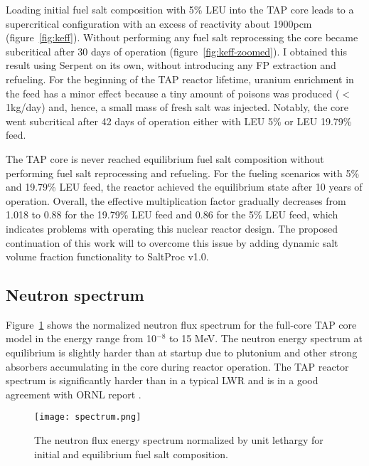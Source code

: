 Loading initial fuel salt composition with 5\% \gls{LEU} into the \gls{TAP} 
core leads to a supercritical configuration with an excess of reactivity about 
1900pcm (figure~\ref{fig:keff}). Without performing any fuel salt reprocessing 
the core became subcritical after 30 days of operation  
(figure~\ref{fig:keff-zoomed}). I obtained this result using Serpent on its 
own, without introducing any \gls{FP} extraction and refueling. For the 
beginning of the \gls{TAP} reactor lifetime, uranium enrichment in the feed 
has a minor effect because a tiny amount of poisons was produced ($<$1kg/day) 
and, hence, a small mass of fresh salt was injected. Notably, the core went 
subcritical after 42 days of operation either with \gls{LEU} 5\% or \gls{LEU} 
19.79\% feed.

The \gls{TAP} core is never reached equilibrium fuel salt composition without 
performing fuel salt reprocessing and refueling. For the fueling scenarios 
with 5\% and 19.79\% \gls{LEU} feed, the reactor achieved the equilibrium 
state after 10 years of operation. Overall, the effective multiplication 
factor gradually decreases from 1.018 to 0.88 for the 19.79\% \gls{LEU} feed 
and 0.86 for the 5\% \gls{LEU} feed, which indicates problems with operating 
this nuclear reactor design. The proposed continuation of this work will to 
overcome this issue by adding dynamic salt volume fraction functionality to 
SaltProc v1.0.

\subsection{Neutron spectrum}
Figure~\ref{fig:spectrum} shows the normalized neutron flux spectrum for the 
full-core \gls{TAP} core model in the energy range from 10$^{-8}$ to 15 MeV. 
The neutron energy spectrum at equilibrium is slightly harder than at 
startup due to plutonium and other strong absorbers accumulating in the 
core during reactor operation. The \gls{TAP} reactor spectrum is significantly 
harder than in a typical \gls{LWR} and is in a good agreement with 
\gls{ORNL} report \cite{betzler_assessment_2017}.
\begin{figure}[htp!] %
	\centering
	\texttt{[image: spectrum.png]}
	\caption{The neutron flux energy spectrum normalized by unit lethargy 
		for initial and equilibrium fuel salt composition.}
	\label{fig:spectrum}
\end{figure}
